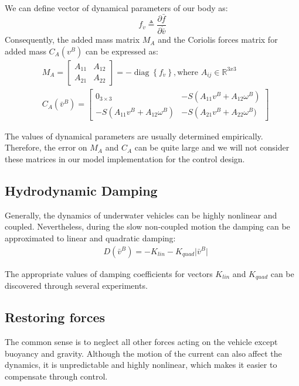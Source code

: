     We can define vector of dynamical parameters of our body as:
    $$
    f_{\dot{v}} \triangleq \frac{\partial \bar{f}}{\partial \dot{\bar{v}}}
    $$
    Consequently, the added mass matrix $M_A$ and 
    the Coriolis forces matrix for added mass $C_A(v^B)$
    can be expressed as: 
    $$
    \begin{aligned}
        & M_A=\left[\begin{array}{cc}
            A_{11} & A_{12} \\
            A_{21} & A_{22}
            \end{array}\right]=-\operatorname{diag}\left\{f_{\dot{v}}\right\}, \textrm{where } A_{ij} \in \mathbb{R}^{3 x 3} \\
        & C_A(\bar{v}^B)=\left[\begin{array}{cc}
        0_{3 \times 3} & -S\left(A_{11} v^B+A_{12} \omega^B\right) \\
        -S\left(A_{11} v^B+A_{12} \omega^B\right) & -S\left(A_{21} v^B+A_{22} \omega^B)\right.
        \end{array}\right]
    \end{aligned}
    $$

    The values of dynamical parameters are usually determined
    empirically. Therefore, the error on $M_A$ and $C_A$ can be quite large and we will not consider
    these matrices in our model implementation for the control design.

\subsection{Hydrodynamic Damping}

    Generally, the dynamics of underwater vehicles can be highly nonlinear and coupled.
    Nevertheless, during the slow non-coupled motion the damping can be approximated to linear and quadratic damping:
    $$\begin{aligned}
        & D(\bar{v}^B)=-K_{lin} - K_{quad}\lvert \bar{v}^B \rvert
    \end{aligned}
    $$

    The appropriate values of damping coefficients for vectors $K_{lin}$ and $K_{quad}$ can be discovered through several experiments.

\subsection{Restoring forces}

    The common sense is to neglect all other forces acting on the vehicle except buoyancy and gravity. 
    Although the motion of the current can also affect the dynamics, it is unpredictable and highly nonlinear, 
    which makes it easier to compensate through control.

